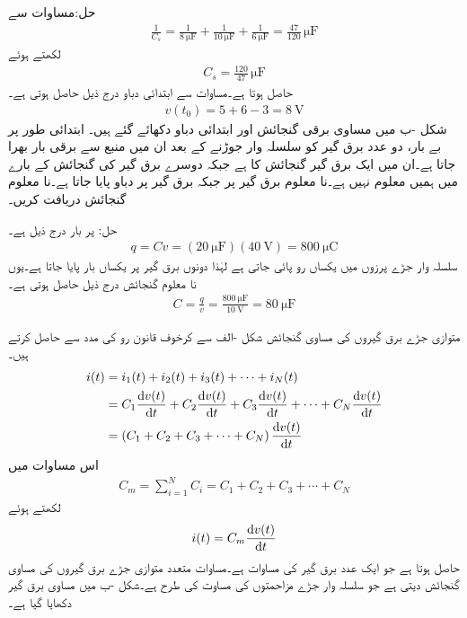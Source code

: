 حل:مساوات  سے
\begin{align*}
\frac{1}{C_s}=\frac{1}{\SI{8}{\micro\farad}}+\frac{1}{\SI{10}{\micro\farad}}+\frac{1}{\SI{6}{\micro\farad}}=\frac{47}{120}\,\si{\micro\farad}
\end{align*}
لکھتے ہوئے
\begin{align*}
C_s=\frac{120}{47} \, \si{\micro\farad}
\end{align*}
حاصل ہوتا ہے۔مساوات  سے ابتدائی دباو درج ذیل حاصل ہوتی ہے۔
\begin{align*}
v(t_0)=5+6-3=\SI{8}{\volt}
\end{align*}
شکل -ب میں مساوی برقی گنجائش اور ابتدائی دباو دکھائے گئے ہیں۔
ابتدائی طور پر بے بار، دو عدد برق گیر کو سلسلہ وار جوڑنے کے بعد ان میں  منبع سے برقی بار بھرا جاتا ہے۔ان میں ایک برق گیر  گنجائش کا ہے جبکہ دوسرے برق گیر کی گنجائش کے بارے میں ہمیں معلوم نہیں ہے۔نا معلوم برق گیر پر  جبکہ  برق گیر پر  دباو پایا جاتا ہے۔نا معلوم  گنجائش دریافت کریں۔

حل: پر بار درج ذیل ہے۔
\begin{align*}
q=C v=\left(\SI{20}{\micro\farad}\right)(\SI{40}{\volt})=\SI{800}{\micro\coulomb}
\end{align*} 
سلسلہ وار جڑے پرزوں میں یکساں رو پائی جاتی ہے لہٰذا دونوں برق گیر پر یکساں بار پایا جاتا ہے۔یوں نا معلوم گنجائش درج ذیل حاصل ہوتی ہے۔
\begin{align*}
C=\frac{q}{v}=\frac{\SI{800}{\micro\farad}}{\SI{10}{\volt}}=\SI{80}{\micro\farad}
\end{align*}

متوازی جڑے برق گیروں کی مساوی گنجائش شکل -الف سے کرخوف قانون رو کی مدد سے حاصل کرتے ہیں۔
\begin{align*}
i(t)&=i_1(t)+i_2(t)+i_3(t)+\cdots +i_N(t)\\
&=C_1 \frac{\dif v(t)}{\dif t}+C_2 \frac{\dif v(t)}{\dif t}+C_3 \frac{\dif v(t)}{\dif t}+\cdots+C_N \frac{\dif v(t)}{\dif t}\\
&=\left(C_1+C_2+C_3+\cdots+C_N\right) \frac{\dif v(t)}{\dif t}
\end{align*}
اس مساوات میں 
\begin{align}\label{مساوات_امالہ_متوازی_برق_گیر_کا_مساوی}
C_m=\sum_{i=1}^{N} C_i=C_1+C_2+C_3+\cdots +C_N
\end{align}
لکھتے ہوئے
\begin{align}
i(t)=C_m \frac{\dif v(t)}{\dif t}
\end{align}
حاصل ہوتا ہے جو ایک عدد برق گیر کی مساوات ہے۔مساوات  متعدد متوازی جڑے برق گیروں کی مساوی گنجائش دیتی ہے جو سلسلہ وار جڑے مزاحمتوں کی مساوت کی طرح ہے۔شکل -ب میں مساوی برق گیر دکھایا گیا ہے۔

